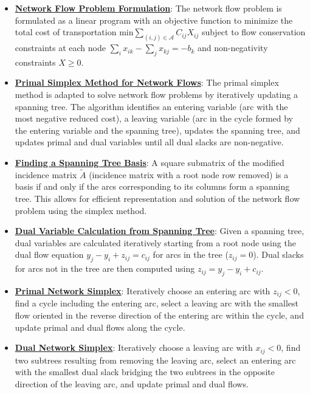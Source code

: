 \documentclass{article}%
\begin{document}
\begin{itemize}[leftmargin=*]%
\item \href{https://www.math.purdue.edu/~yipn/421/2024-11-05-NetFlows.pdf#page=2}{\textbf{Network Flow Problem Formulation}}: The network flow problem is formulated as a linear program with an objective function to minimize the total cost of transportation $\text{min} \sum_{(i,j) \in \mathcal{A}} C_{ij} X_{ij}$ subject to flow conservation constraints at each node $\sum_{i} x_{ik} - \sum_{j} x_{kj} = -b_k$ and non-negativity constraints $X \ge 0$.%
\item \href{https://www.math.purdue.edu/~yipn/421/2024-11-05-NetFlows.pdf#page=22}{\textbf{Primal Simplex Method for Network Flows}}: The primal simplex method is adapted to solve network flow problems by iteratively updating a spanning tree. The algorithm identifies an entering variable (arc with the most negative reduced cost), a leaving variable (arc in the cycle formed by the entering variable and the spanning tree), updates the spanning tree, and updates primal and dual variables until all dual slacks are non-negative.%
\item \href{https://www.math.purdue.edu/~yipn/421/2024-11-05-NetFlows.pdf#page=15}{\textbf{Finding a Spanning Tree Basis}}: A square submatrix of the modified incidence matrix $\tilde{A}$ (incidence matrix with a root node row removed) is a basis if and only if the arcs corresponding to its columns form a spanning tree. This allows for efficient representation and solution of the network flow problem using the simplex method.%
\item \href{https://www.math.purdue.edu/~yipn/421/2024-11-05-NetFlows.pdf#page=18}{\textbf{Dual Variable Calculation from Spanning Tree}}: Given a spanning tree, dual variables are calculated iteratively starting from a root node using the dual flow equation $y_j - y_i + z_{ij} = c_{ij}$ for arcs in the tree ($z_{ij} = 0$). Dual slacks for arcs not in the tree are then computed using $z_{ij} = y_j - y_i + c_{ij}$.%
\end{itemize}%
\begin{itemize}[leftmargin=*]%
\item \href{https://www.math.purdue.edu/~yipn/421/2024-11-07-NetSimplex.pdf#page=5}{\textbf{Primal Network Simplex}}: Iteratively choose an entering arc with $z_{ij} < 0$, find a cycle including the entering arc, select a leaving arc with the smallest flow oriented in the reverse direction of the entering arc within the cycle, and update primal and dual flows along the cycle.%
\item \href{https://www.math.purdue.edu/~yipn/421/2024-11-07-NetSimplex.pdf#page=32}{\textbf{Dual Network Simplex}}: Iteratively choose a leaving arc with $x_{ij} < 0$, find two subtrees resulting from removing the leaving arc, select an entering arc with the smallest dual slack bridging the two subtrees in the opposite direction of the leaving arc, and update primal and dual flows.%
\end{itemize}%
\end{document}
